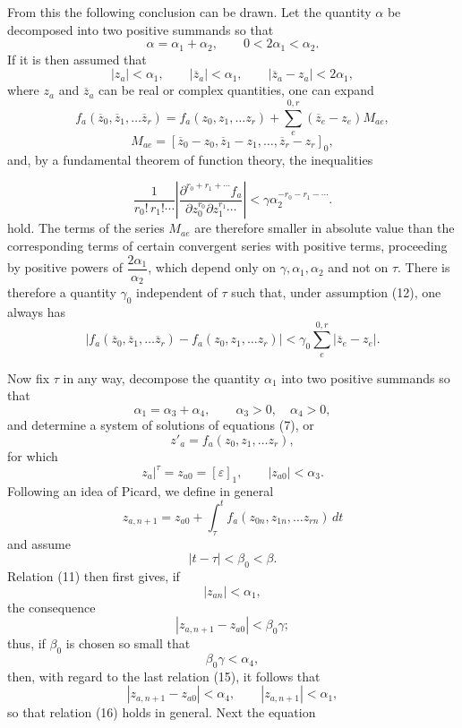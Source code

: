 \documentclass[11pt,a4paper,leqno]{article}
\begin{document}
From this the following conclusion can be drawn. Let the quantity $\alpha$
be decomposed into two positive summands so that
\[
\alpha=\alpha_1+\alpha_2,\qquad 0<2\alpha_1<\alpha_2.
\]
If it is then assumed that
\begin{equation}\tag{12}
|z_a|<\alpha_1,\qquad |\overline z_a|<\alpha_1,\qquad
|\overline z_a-z_a|<2\alpha_1,
\end{equation}
where $z_a$ and $\overline z_a$ can be real or complex quantities, one can
expand
\[
f_a(\overline z_0,\overline z_1,\ldots\overline z_r)
=f_a(z_0,z_1,\ldots z_r)
+\sum_e^{0,r}(\overline z_e-z_e)M_{ae},
\]
\[
M_{ae}=[\overline z_0-z_0,\overline z_1-z_1,\ldots,
\overline z_r-z_r]_0,
\]
and, by a fundamental theorem of function theory, the inequalities

\[
\frac{1}{r_0!\,r_1!\cdots}
\left|\frac{\partial^{r_0+r_1+\cdots}f_a}
{\partial z_0^{r_0}\partial z_1^{r_1}\cdots}\right|
<\gamma\alpha_2^{-r_0-r_1-\cdots}.
\]
hold. The terms of the series $M_{ae}$ are therefore smaller in absolute
value than the corresponding terms of certain convergent series with
positive terms, proceeding by positive powers of
$\dfrac{2\alpha_1}{\alpha_2}$, which depend only on
$\gamma,\alpha_1,\alpha_2$ and not on $\tau$. There is therefore a
quantity $\gamma_0$ independent of $\tau$ such that, under assumption (12),
one always has
\begin{equation}\tag{13}
|f_a(\overline z_0,\overline z_1,\ldots\overline z_r)
-f_a(z_0,z_1,\ldots z_r)|
<\gamma_0\sum_e^{0,r}|\overline z_e-z_e|.
\end{equation}

Now fix $\tau$ in any way, decompose the quantity $\alpha_1$ into two
positive summands so that
\[
\alpha_1=\alpha_3+\alpha_4,\qquad \alpha_3>0,\quad\alpha_4>0,
\]
and determine a system of solutions of equations (7), or
\begin{equation}\tag{14}
z'_a=f_a(z_0,z_1,\ldots z_r),
\end{equation}
for which
\begin{equation}\tag{15}
\left.z_a\right|^\tau=z_{a0}=[\varepsilon]_1,\qquad
|z_{a0}|<\alpha_3.
\end{equation}
Following an idea of Picard, we define in general
\[
z_{a,n+1}=z_{a0}+\int_\tau^t
f_a(z_{0n},z_{1n},\ldots z_{rn})\,dt
\]
and assume
\[
|t-\tau|<\beta_0<\beta.
\]
Relation (11) then first gives, if
\begin{equation}\tag{16}
|z_{an}|<\alpha_1,
\end{equation}
the consequence
\[
|z_{a,n+1}-z_{a0}|<\beta_0\gamma;
\]
thus, if $\beta_0$ is chosen so small that
\begin{equation}\tag{17}
\beta_0\gamma<\alpha_4,
\end{equation}
then, with regard to the last relation (15), it follows that
\[
|z_{a,n+1}-z_{a0}|<\alpha_4,\qquad |z_{a,n+1}|<\alpha_1,
\]
so that relation (16) holds in general. Next the equation
\end{document}
